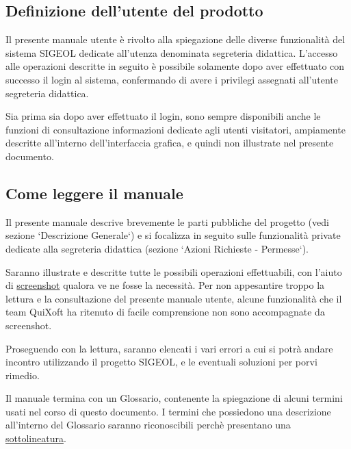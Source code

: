\documentclass[11pt,a4paper]{article}
\begin{document}
\subsection{Definizione dell'utente del prodotto}
Il presente manuale utente è rivolto alla spiegazione delle diverse funzionalità del sistema SIGEOL dedicate all'utenza denominata segreteria didattica.
L'accesso alle operazioni descritte in seguito è possibile solamente dopo aver effettuato con successo il login al sistema, confermando di avere i privilegi assegnati all'utente segreteria didattica.

Sia prima sia dopo aver effettuato il login, sono sempre disponibili anche le funzioni di consultazione informazioni dedicate agli utenti visitatori, ampiamente descritte all'interno dell'interfaccia grafica, e quindi non illustrate nel presente documento.
\subsection{Come leggere il manuale}
Il presente manuale descrive brevemente le parti pubbliche del progetto (vedi sezione `Descrizione Generale`) e si focalizza in seguito sulle funzionalità private dedicate alla segreteria didattica (sezione `Azioni Richieste - Permesse`).

Saranno illustrate e descritte tutte le possibili operazioni effettuabili, con l'aiuto di \underline{screenshot} qualora ve ne fosse la necessità.
Per non appesantire troppo la lettura e la consultazione del presente manuale utente, alcune funzionalità che il team QuiXoft ha ritenuto di facile comprensione non sono accompagnate da screenshot.

Proseguendo con la lettura, saranno elencati i vari errori a cui si potrà andare incontro utilizzando il progetto SIGEOL, e le eventuali soluzioni per porvi rimedio.

Il manuale termina con un Glossario, contenente la spiegazione di alcuni termini usati nel corso di questo documento.
I termini che possiedono una descrizione all'interno del Glossario saranno riconoscibili perchè presentano una \underline{sottolineatura}.
\end{document}
